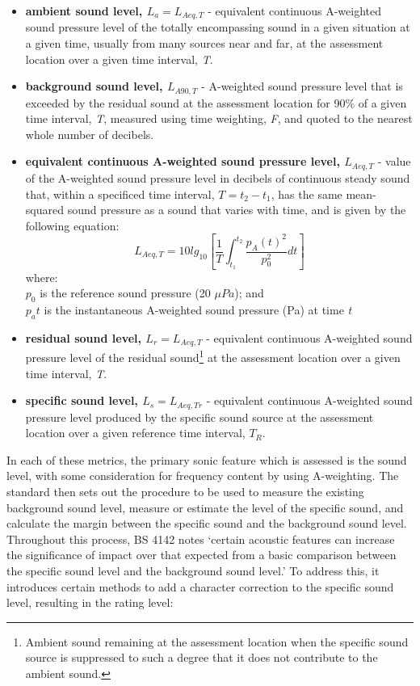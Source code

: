 \begin{itemize}
  \item \textbf{ambient sound level, $L_a = L_{Aeq,T}$} - equivalent continuous A-weighted sound pressure level of the totally encompassing sound in a given situation at a given time, usually from many sources near and far, at the assessment location over a given time interval, \emph{T}.
  \item \textbf{background sound level, $L_{A90,T}$} - A-weighted sound pressure level that is exceeded by the residual sound at the assessment location for 90\% of a given time interval, \emph{T}, measured using time weighting, \emph{F}, and quoted to the nearest whole number of decibels.
  \item \textbf{equivalent continuous A-weighted sound pressure level, $L_{Aeq,T}$} - value of the A-weighted sound pressure level in decibels of continuous steady sound that, within a specificed time interval, $T = t_2 - t_1$, has the same mean-squared sound pressure as a sound that varies with time, and is given by the following equation:
    $$L_{Aeq,T} = 10 lg_{10} \left[\frac{1}{T} \int^{t_2}_{t_1} \frac{p_A(t)^2}{p_0^2}dt \right]$$
    where: \\
      \space $p_0$ is the reference sound pressure (20 $\mu Pa$); and\\
      \space $p_a{t}$ is the instantaneous A-weighted sound pressure (Pa) at time \emph{t}
  \item \textbf{residual sound level, $L_r=L_{Aeq,T}$} - equivalent continuous A-weighted sound pressure level of the residual sound\footnote{Ambient sound remaining at the assessment location when the specific sound source is suppressed to such a degree that it does not contribute to the ambient sound.} at the assessment location over a given time interval, \emph{T}.
  \item \textbf{specific sound level, $L_s=L_{Aeq,Tr}$} - equivalent continuous A-weighted sound pressure level produced by the specific sound source at the assessment location over a given reference time interval, $T_R$.
\end{itemize}

In each of these metrics, the primary sonic feature which is assessed is the sound level, with some consideration for frequency content by using A-weighting. The standard then sets out the procedure to be used to measure the existing background sound level, measure or estimate the level of the specific sound, and calculate the margin between the specific sound and the background sound level. Throughout this process, BS 4142 notes `certain acoustic features can increase the significance of impact over that expected from a basic comparison between the specific sound level and the background sound level.' To address this, it introduces certain methods to add a character correction to the specific sound level, resulting in the rating level:

